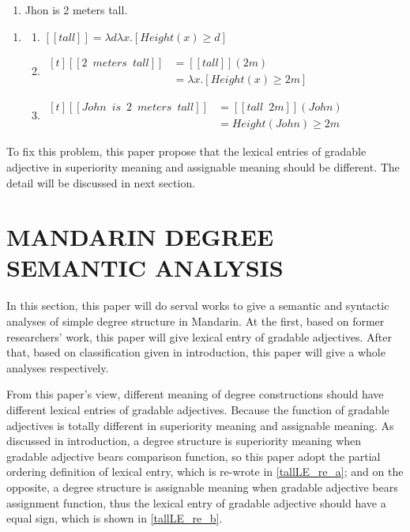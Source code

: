 \documentclass{ctexart}
\begin{document}
\begin{enumerate}
    \item \label{john_gao_2_mi} Jhon is 2 meters tall.
\end{enumerate}

\begin{enumerate}
    \item \label{john_gao_2_mi_LE}
    
    \begin{enumerate}
    \item \label{john_gao_2_mi_LE_a} 
    $[\![tall]\!] = \lambda d \lambda x.[Height(x) \geq d]$
    
    \item \label{john_gao_2_mi_LE_b} 
    $\begin{aligned}[t]
        [\![2 \enspace meters \enspace tall]\!] &= [\![tall]\!](2m) \\
        &= \lambda x.[Height(x) \geq 2m]
    \end{aligned}$
    
    \item \label{john_gao_2_mi_LE_c} 
    $\begin{aligned}[t]
        [\![John \enspace is \enspace 2 \enspace meters \enspace tall]\!] &= [\![tall \enspace 2m]\!](John) \\
        &= Height(John) \geq 2m
    \end{aligned}$
    
    \end{enumerate}
\end{enumerate}

To fix this problem, this paper propose that the lexical entries of gradable adjective in superiority meaning and assignable meaning should be different. The detail will be discussed in next section.


\section{MANDARIN DEGREE SEMANTIC ANALYSIS}

\noindent
In this section, this paper will do serval works to give a semantic and syntactic analyses of simple degree structure in Mandarin. At the first, based on former researchers' work, this paper will give lexical entry of gradable adjectives. After that, based on classification given in introduction, this paper will give a whole analyses respectively.

From this paper's view, different meaning of degree constructions should have different lexical entries of gradable adjectives. Because the function of gradable adjectives is totally different in superiority meaning and assignable meaning. As discussed in introduction, a degree structure is superiority meaning when gradable adjective bears comparison function, so this paper adopt the partial ordering definition of lexical entry, which is re-wrote in \ref{tallLE_re_a}; and on the opposite, a degree structure is assignable meaning when gradable adjective bears assignment function, thus the lexical entry of gradable adjective should have a equal sign, which is shown in \ref{tallLE_re_b}.
\end{document}
